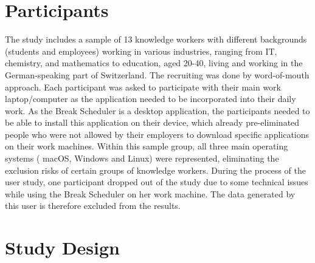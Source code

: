 \documentclass{hasel_thesis}
\begin{document}
\section{Participants}

 The study includes a sample of 13 knowledge workers with different backgrounds (students and employees) working in various industries, ranging from IT, chemistry, and mathematics to education, aged 20-40, living and working in the German-speaking part of Switzerland. The recruiting was done by word-of-mouth approach. Each participant was asked to participate with their main work laptop/computer as the application needed to be incorporated into their daily work. As the Break Scheduler is a desktop application, the participants needed to be able to install this application on their device, which already pre-eliminated people who were not allowed by their employers to download specific applications on their work machines. Within this sample group, all three main operating systems ( macOS, Windows and Linux) were represented, eliminating the exclusion risks of certain groups of knowledge workers. During the process of the user study, one participant dropped out of the study due to some technical issues while using the Break Scheduler on her work machine. The data generated by this user is therefore excluded from the results.

\section{Study Design}

\end{document}

